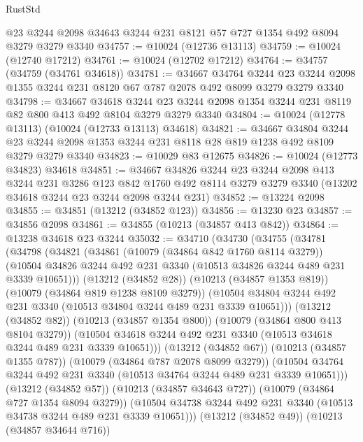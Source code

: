 \begin{lexlean}{RustStd}
\begin{coremodule}
    @23
    @3244
    @2098
    @34643
    @3244
    @231
    @8121
    @57
    @727
    @1354
    @492
    @8094
    @3279
    @3279
    @3340
@34757 := @10024 (@12736 @13113)
@34759 := @10024 (@12740 @17212)
@34761 := @10024 (@12702 @17212)
@34764 := @34757 (@34759 (@34761 @34618))
@34781 := @34667
    @34764
    @3244
    @23
    @3244
    @2098
    @1355
    @3244
    @231
    @8120
    @67
    @787
    @2078
    @492
    @8099
    @3279
    @3279
    @3340
@34798 := @34667
    @34618
    @3244
    @23
    @3244
    @2098
    @1354
    @3244
    @231
    @8119
    @82
    @800
    @413
    @492
    @8104
    @3279
    @3279
    @3340
@34804 := @10024 (@12778 @13113) (@10024 (@12733 @13113) @34618)
@34821 := @34667
    @34804
    @3244
    @23
    @3244
    @2098
    @1353
    @3244
    @231
    @8118
    @28
    @819
    @1238
    @492
    @8109
    @3279
    @3279
    @3340
@34823 := @10029 @83 @12675
@34826 := @10024 (@12773 @34823) @34618
@34851 := @34667
    @34826
    @3244
    @23
    @3244
    @2098
    @413
    @3244
    @231
    @3286
    @123
    @842
    @1760
    @492
    @8114
    @3279
    @3279
    @3340
    (@13202 @34618 @3244 @23 @3244 @2098 @3244 @231)
@34852 := @13224 @2098
@34855 := @34851 (@13212 (@34852 @123))
@34856 := @13230 @23
@34857 := @34856 @2098
@34861 := @34855 (@10213 (@34857 @413 @842))
@34864 := @13238 @34618 @23 @3244
@35032 := @34710
    (@34730
      (@34755
        (@34781
          (@34798
            (@34821
              (@34861
                (@10079 (@34864 @842 @1760 @8114 @3279))
                (@10504 @34826 @3244 @492 @231 @3340 (@10513 @34826 @3244 @489 @231 @3339 @10651)))
              (@13212 (@34852 @28))
              (@10213 (@34857 @1353 @819))
              (@10079 (@34864 @819 @1238 @8109 @3279))
              (@10504 @34804 @3244 @492 @231 @3340 (@10513 @34804 @3244 @489 @231 @3339 @10651)))
            (@13212 (@34852 @82))
            (@10213 (@34857 @1354 @800))
            (@10079 (@34864 @800 @413 @8104 @3279))
            (@10504 @34618 @3244 @492 @231 @3340 (@10513 @34618 @3244 @489 @231 @3339 @10651)))
          (@13212 (@34852 @67))
          (@10213 (@34857 @1355 @787))
          (@10079 (@34864 @787 @2078 @8099 @3279))
          (@10504 @34764 @3244 @492 @231 @3340 (@10513 @34764 @3244 @489 @231 @3339 @10651)))
        (@13212 (@34852 @57))
        (@10213 (@34857 @34643 @727))
        (@10079 (@34864 @727 @1354 @8094 @3279))
        (@10504 @34738 @3244 @492 @231 @3340 (@10513 @34738 @3244 @489 @231 @3339 @10651)))
      (@13212 (@34852 @49))
      (@10213 (@34857 @34644 @716))

\end{coremodule}
\end{lexlean}
